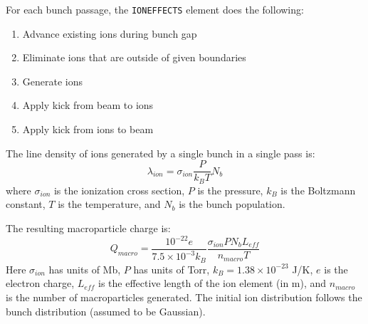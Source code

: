 
For each bunch passage, the \verb|IONEFFECTS| element does the following:

\begin{enumerate}
\item Advance existing ions during bunch gap
\item Eliminate ions that are outside of given boundaries
\item Generate ions 
\item Apply kick from beam to ions 
\item Apply kick from ions to beam
\end{enumerate}


The line density of ions generated by a single bunch in a single pass is:
\begin{equation}
\lambda_{ion} = \sigma_{ion} \frac{P}{k_B T} N_b
\end{equation}
where $\sigma_{ion}$ is the ionization cross section, $P$ is the pressure, $k_B$ is the Boltzmann constant, $T$ is the temperature, and $N_b$ is the bunch population.

The resulting macroparticle charge is:
\begin{equation}
Q_{macro} = \frac{10^{-22} e}{7.5\times10^{-3} k_B} \frac{\sigma_{ion} P N_b L_{eff}}{n_{macro} T}
\end{equation}
Here $\sigma_{ion}$ has units of Mb, $P$ has units of Torr, $k_B = 1.38\times10^{-23}$ J/K, $e$ is the electron charge, $L_{eff}$ is the effective length of the ion element (in m), and $n_{macro}$ is the number of macroparticles generated.
The initial ion distribution follows the bunch distribution (assumed to be Gaussian).


